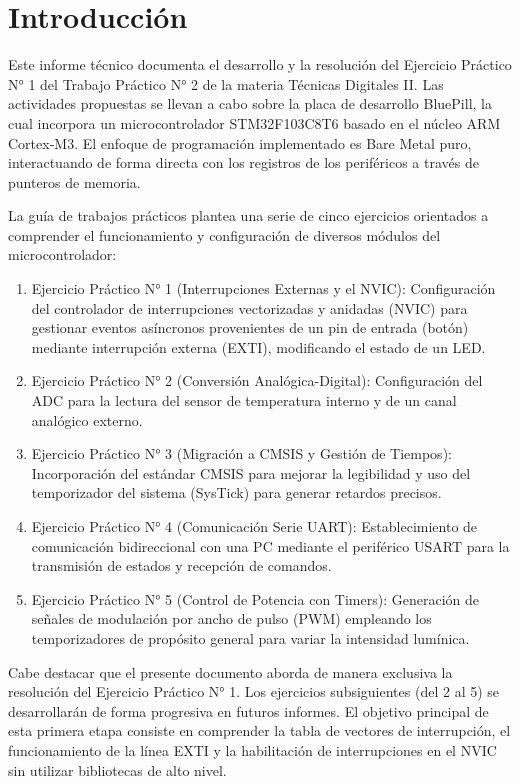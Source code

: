 \chapter{Introducción}
\label{ch:introduccion}

Este informe técnico documenta el desarrollo y la resolución del Ejercicio Práctico N° 1 del Trabajo Práctico N° 2
de la materia Técnicas Digitales II. Las actividades propuestas se llevan a cabo sobre la placa de desarrollo
BluePill, la cual incorpora un microcontrolador STM32F103C8T6 basado en el núcleo ARM Cortex-M3. El enfoque de
programación implementado es Bare Metal puro, interactuando de forma directa con los registros de los periféricos a
través de punteros de memoria.

La guía de trabajos prácticos plantea una serie de cinco ejercicios orientados a comprender el funcionamiento y
configuración de diversos módulos del microcontrolador:

\begin{enumerate}
    \item Ejercicio Práctico N° 1 (Interrupciones Externas y el NVIC): Configuración del controlador de
    interrupciones vectorizadas y anidadas (NVIC) para gestionar eventos asíncronos provenientes de un pin de
    entrada (botón) mediante interrupción externa (EXTI), modificando el estado de un LED.
    \item Ejercicio Práctico N° 2 (Conversión Analógica-Digital): Configuración del ADC para la lectura
    del sensor de temperatura interno y de un canal analógico externo.
    \item Ejercicio Práctico N° 3 (Migración a CMSIS y Gestión de Tiempos): Incorporación del estándar
    CMSIS para mejorar la legibilidad y uso del temporizador del sistema (SysTick) para generar retardos precisos.
    \item Ejercicio Práctico N° 4 (Comunicación Serie UART): Establecimiento de comunicación
    bidireccional con una PC mediante el periférico USART para la transmisión de estados y recepción de comandos.
    \item Ejercicio Práctico N° 5 (Control de Potencia con Timers): Generación de señales de modulación por
    ancho de pulso (PWM) empleando los temporizadores de propósito general para variar la intensidad lumínica.
\end{enumerate}

Cabe destacar que el presente documento aborda de manera exclusiva la resolución del Ejercicio Práctico N° 1. Los
ejercicios subsiguientes (del 2 al 5) se desarrollarán de forma progresiva en futuros informes. El objetivo principal
de esta primera etapa consiste en comprender la tabla de vectores de interrupción, el funcionamiento de la línea EXTI
y la habilitación de interrupciones en el NVIC sin utilizar bibliotecas de alto nivel.
